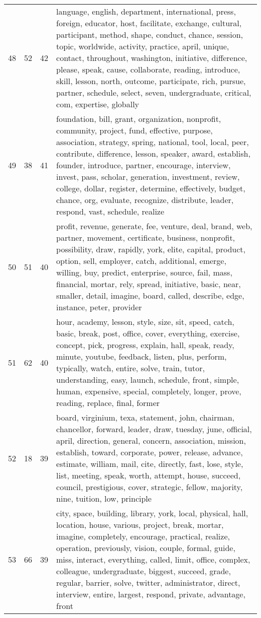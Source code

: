 \begin{table}[ht]
{\begin{tabularx}{\textwidth}{llrX}
   48 & 52 & 42 & language, english, department, international, press, foreign, educator, host, facilitate, exchange, cultural, participant, method, shape, conduct, chance, session, topic, worldwide, activity, practice, april, unique, contact, throughout, washington, initiative, difference, please, speak, cause, collaborate, reading, introduce, skill, lesson, north, outcome, participate, rich, pursue, partner, schedule, select, seven, undergraduate, critical, com, expertise, globally \\ 
   49 & 38 & 41 & foundation, bill, grant, organization, nonprofit, community, project, fund, effective, purpose, association, strategy, spring, national, tool, local, peer, contribute, difference, lesson, speaker, award, establish, founder, introduce, partner, encourage, interview, invest, pass, scholar, generation, investment, review, college, dollar, register, determine, effectively, budget, chance, org, evaluate, recognize, distribute, leader, respond, vast, schedule, realize \\ 
   50 & 51 & 40 & profit, revenue, generate, fee, venture, deal, brand, web, partner, movement, certificate, business, nonprofit, possibility, draw, rapidly, york, elite, capital, product, option, sell, employer, catch, additional, emerge, willing, buy, predict, enterprise, source, fail, mass, financial, mortar, rely, spread, initiative, basic, near, smaller, detail, imagine, board, called, describe, edge, instance, peter, provider \\ 
   51 & 62 & 40 & hour, academy, lesson, style, size, sit, speed, catch, basic, break, post, office, cover, everything, exercise, concept, pick, progress, explain, hall, speak, ready, minute, youtube, feedback, listen, plus, perform, typically, watch, entire, solve, train, tutor, understanding, easy, launch, schedule, front, simple, human, expensive, special, completely, longer, prove, reading, replace, final, former \\ 
   52 & 18 & 39 & board, virginium, texa, statement, john, chairman, chancellor, forward, leader, draw, tuesday, june, official, april, direction, general, concern, association, mission, establish, toward, corporate, power, release, advance, estimate, william, mail, cite, directly, fast, lose, style, list, meeting, speak, worth, attempt, house, succeed, council, prestigious, cover, strategic, fellow, majority, nine, tuition, low, principle \\ 
   53 & 66 & 39 & city, space, building, library, york, local, physical, hall, location, house, various, project, break, mortar, imagine, completely, encourage, practical, realize, operation, previously, vision, couple, formal, guide, miss, interact, everything, called, limit, office, complex, colleague, undergraduate, biggest, succeed, grade, regular, barrier, solve, twitter, administrator, direct, interview, entire, largest, respond, private, advantage, front \\ 

\end{tabularx}}
\end{table}
